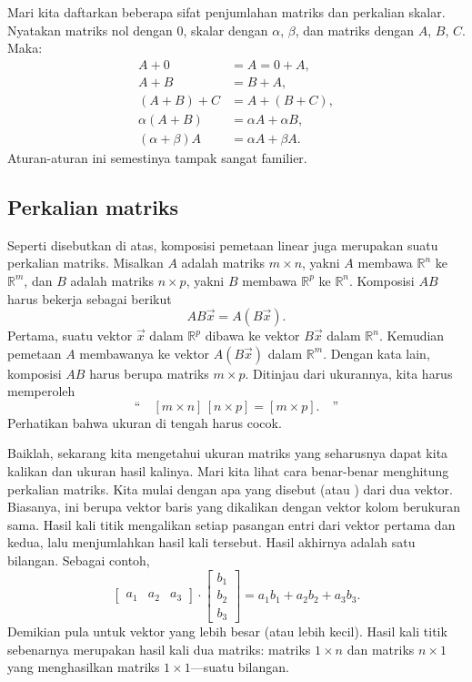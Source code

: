 Mari kita daftarkan beberapa sifat penjumlahan matriks dan perkalian skalar.
Nyatakan matriks nol dengan $0$,
skalar dengan $\alpha$, $\beta$, dan matriks dengan $A$, $B$, $C$. Maka:
\begin{align*}
A + 0 & = A = 0 + A , \\
A + B & = B + A , \\
(A + B) + C & = A + (B + C) , \\
\alpha(A+B) & = \alpha A+\alpha B, \\
(\alpha+\beta)A & = \alpha A + \beta A.
\end{align*}
Aturan-aturan ini semestinya tampak sangat familier.

\subsection{Perkalian matriks}

Seperti disebutkan di atas, komposisi pemetaan linear juga merupakan suatu
perkalian matriks. Misalkan $A$ adalah matriks $m \times n$,
yakni $A$ membawa
${\mathbb R}^n$ ke
${\mathbb R}^m$,
dan $B$ adalah matriks $n \times p$, yakni $B$ membawa
${\mathbb R}^p$ ke
${\mathbb R}^n$. Komposisi $AB$ harus bekerja sebagai berikut
\begin{equation*}
AB\vec{x} = A(B\vec{x}) .
\end{equation*}
Pertama, suatu vektor $\vec{x}$ dalam ${\mathbb R}^p$ dibawa ke
vektor $B\vec{x}$ dalam
${\mathbb R}^n$. Kemudian pemetaan $A$ membawanya ke vektor $A(B\vec{x})$
dalam ${\mathbb R}^m$. Dengan kata lain, komposisi $AB$ harus berupa matriks $m
\times p$. Ditinjau dari ukurannya, kita harus memperoleh
\begin{equation*}
\text{``}
\quad
[ m \times n ]
\,
[ n \times p ]
=
[ m \times p ] . \quad
\text{''}
\end{equation*}
Perhatikan bahwa ukuran di tengah harus cocok.

Baiklah\@, sekarang kita mengetahui ukuran matriks yang seharusnya dapat kita kalikan
dan ukuran hasil kalinya.
Mari kita lihat cara benar-benar menghitung perkalian matriks.
Kita mulai dengan apa yang disebut
\emph{} (atau \emph{}) dari dua vektor.
Biasanya, ini berupa vektor baris yang dikalikan
dengan vektor kolom berukuran sama. Hasil kali titik mengalikan
setiap pasangan entri dari vektor pertama dan kedua, lalu menjumlahkan
hasil kali tersebut. Hasil akhirnya adalah satu bilangan.
Sebagai contoh,
\begin{equation*}
\begin{bmatrix}
a_1 & a_2 & a_3
\end{bmatrix}
\cdot
\begin{bmatrix}
b_1 \\
b_2 \\
b_3
\end{bmatrix}
= a_1 b_1 + a_2 b_2 + a_3 b_3 .
\end{equation*}
Demikian pula untuk vektor yang lebih besar (atau lebih kecil).
Hasil kali titik sebenarnya merupakan hasil kali dua matriks: matriks $1 \times n$
dan matriks $n \times 1$ yang menghasilkan
matriks $1 \times 1$---suatu bilangan.

